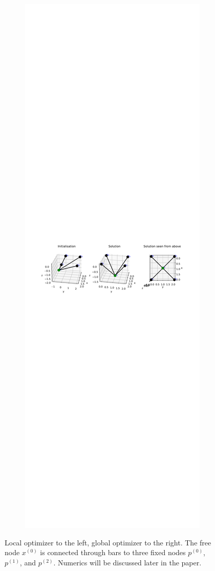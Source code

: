 \begin{figure}
\begin{subfigure}{.5\textwidth}
  \label{fig:}
\end{subfigure}%
\begin{subfigure}{.5\textwidth}
  \centering
  \includegraphics[width=1\linewidth]{Bilder/localminneg.pdf}
  \label{fig:sub2}
\end{subfigure}
\caption{Local optimizer to the left, global optimizer to the right. The free node $x^{(0)}$ is connected through bars to three fixed nodes  $p^{(0)}$, $p^{(1)}$, and $p^{(2)}$. Numerics will be discussed later in the paper.}
\label{fig:local_optimizer}
\end{figure}

